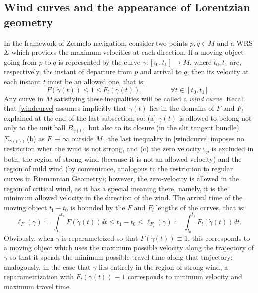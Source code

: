 \documentclass[reqno,10pt]{amsart}
\begin{document}
\subsection{Wind curves and the appearance of Lorentzian geometry} In the framework of Zermelo navigation, consider two points $p,q\in M$ and a WRS $\Sigma$ which provides the maximum velocities at each direction. If a moving object going from $p$ to $q$ is represented by the curve $\gamma: [t_0,t_1]\rightarrow M$, where $t_0, t_1$ are,  respectively,  the instant of departure from $p$ and arrival to $q$, then its velocity  at each instant $t$ must be an allowed one, that is:
\begin{equation}\label{windcurve}
F(\dot\gamma(t)) \leq 1 \leq 
F_l(\dot\gamma(t)), \qquad \qquad \forall t\in[t_0,t_1].
\end{equation}
Any curve in $M$ satisfiying these inequalities will be called a {\em wind curve}. Recall that \eqref{windcurve} assumes implicitly that $\dot\gamma(t)$  lies in the domains of $F$ and $F_l$ explained at the end of the last subsection, so:
(a) $\dot\gamma(t)$ is allowed to belong not only to the unit ball $B_{\gamma(t)}$ 
but also to its closure (in the slit tangent bundle) $
\Sigma_{\gamma(t)}$, (b) as $F_l\equiv \infty$ outside $M_l$, the last inequality 
in \eqref{windcurve} imposes no restriction when the wind is not strong, and (c) the zero velocity $0_p$ is excluded  in both, the region of strong wind (because it is not an allowed velocity) and  
the region of mild wind (by convenience, analogous to the restriction to regular curves in Riemannian Geometry); however, the zero-velocity is allowed in the region of critical wind, as it has a special meaning there, namely, it is  the minimum allowed velocity in the direction of the wind. %
The arrival time of the moving object $t_1-t_0$ is bounded by the $F$ and $F_l$ lengths of the curves, that is:
$$
\ell_F(\gamma):= \int_{t_0}^{t_1}F(\dot\gamma(t))dt \leq t_1-t_0 \leq \ell_{F_l}(\gamma):= \int_{t_0}^{t_1}F_l(\dot\gamma(t))dt .
$$ 
Obviously, when $\gamma$ is reparametrized so that $F(\dot\gamma(t))\equiv 1$, this corresponds to a moving object which  uses the maximum possible velocity along the trajectory of $\gamma$ so that it  spends the  minimum possible travel time along that trajectory; analogously, in the case that  $\gamma$ lies entirely in the region of strong wind, a reparametrization with $F_l(\dot\gamma(t))\equiv 1$ corresponds to minimum velocity and  maximum travel time.
\end{document}
